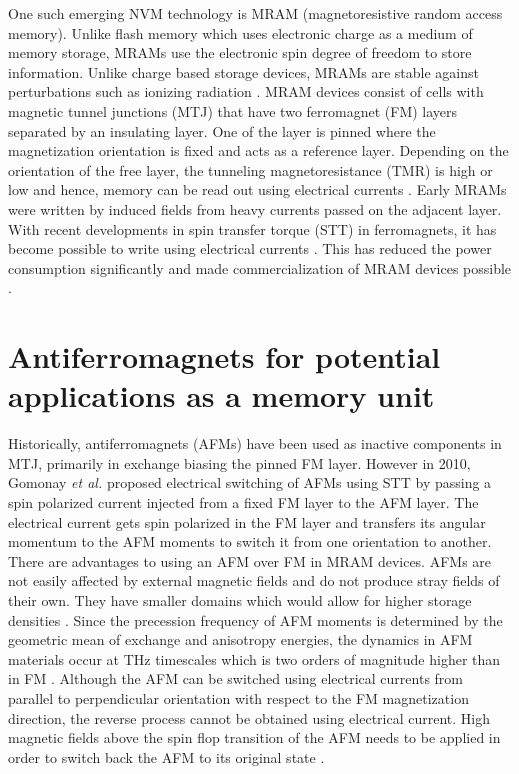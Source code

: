 \documentclass[letterpaper,10pt,doublespacing,edeposit]{uiucthesis2020}
\begin{document}
\begin{mainmatter}
One such emerging NVM technology is MRAM (magnetoresistive random access memory). Unlike flash memory which uses electronic charge as a medium of memory storage, MRAMs use the electronic spin degree of freedom to store information. Unlike charge based storage devices, MRAMs are stable against perturbations such as ionizing radiation \cite{Wadley2016}. MRAM devices consist of cells with magnetic tunnel junctions (MTJ) that have two ferromagnet (FM) layers separated by an insulating layer. One of the layer is pinned where the magnetization orientation is fixed and acts as a reference layer. Depending on the orientation of the free layer, the tunneling magnetoresistance (TMR) is high or low and hence, memory can be read out using electrical currents \cite{Krishnan2016}. Early MRAMs were written by induced fields from heavy currents passed on the adjacent layer. With recent developments in spin transfer torque (STT) in ferromagnets, it has become possible to write using electrical currents \cite{Chappert2007}. This has reduced the power consumption significantly and made commercialization of MRAM devices possible \cite{Krishnan2016,Bhatti2017}.

\section{Antiferromagnets for potential applications as a memory unit}

Historically, antiferromagnets (AFMs) have been used as inactive components in MTJ, primarily in exchange biasing the pinned FM layer. However in 2010, Gomonay \emph{et al.} \cite{Gomonay2010} proposed electrical switching of AFMs using STT by passing a spin polarized current injected from a fixed FM layer to the AFM layer. The electrical current gets spin polarized in the FM layer and transfers its angular momentum to the AFM moments to switch it from one orientation to another. There are advantages to using an AFM over FM in MRAM devices. AFMs are not easily affected by external magnetic fields and do not produce stray fields of their own. They have smaller domains which would allow for higher storage densities \cite{Wadley2016}. Since the precession frequency of AFM moments is determined by the geometric mean of exchange and anisotropy energies, the dynamics in AFM materials occur at THz timescales which is two orders of magnitude higher than in FM \cite{Siddiqui2020}. Although the AFM can be switched using electrical currents from parallel to perpendicular orientation with respect to the FM magnetization direction, the reverse process cannot be obtained using electrical current. High magnetic fields above the spin flop transition of the AFM needs to be applied in order to switch back the AFM to its original state \cite{Gomonay2010}.


\end{mainmatter}
\end{document}

